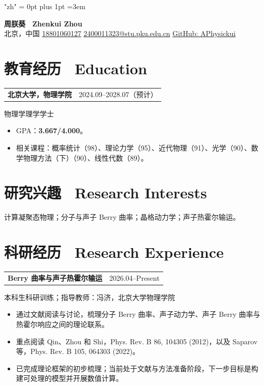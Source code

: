 \documentclass[10pt,a4paper]{article}
\makeatletter
\newcommand{\cventry}[2]{%
  \begin{tabularx}{\textwidth}{@{}Xr@{}}
    \textbf{#1} & #2
  \end{tabularx}
}
\makeatother
\begin{document}
\fontsize{9.5}{12}\selectfont
\XeTeXlinebreaklocale "zh"
\XeTeXlinebreakskip = 0pt plus 1pt
\emergencystretch=3em
\sloppy

\begin{center}
  {\LARGE\bfseries 周朕葵 \textbar\ Zhenkui Zhou}\\[4pt]
  北京，中国
  \enspace\textbar\enspace
  \href{tel:+8618801060127}{18801060127}
  \enspace\textbar\enspace
  \href{mailto:2400011323@stu.pku.edu.cn}{2400011323@stu.pku.edu.cn}
  \enspace\textbar\enspace
  \href{https://github.com/APhysickui}{GitHub: APhysickui}
\end{center}

\section*{教育经历 \textbar\ Education}

\cventry{北京大学，物理学院}{2024.09--2028.07（预计）}
物理学理学学士
\begin{itemize}
  \item GPA：\textbf{3.667/4.000}。
  \item 相关课程：概率统计（98）、理论力学（95）、近代物理（91）、光学（90）、数学物理方法（下）（90）、线性代数（89）。
\end{itemize}

\section*{研究兴趣 \textbar\ Research Interests}
计算凝聚态物理；分子与声子 Berry 曲率；晶格动力学；声子热霍尔输运。

\section*{科研经历 \textbar\ Research Experience}

\cventry{Berry 曲率与声子热霍尔输运}{2026.04--Present}
本科生科研训练；指导教师：冯济，北京大学物理学院
\begin{itemize}
  \item 通过文献阅读与讨论，梳理分子 Berry 曲率、声子动力学、声子 Berry 曲率与热霍尔响应之间的理论联系。
  \item 重点阅读 Qin、Zhou 和 Shi，Phys. Rev. B 86, 104305 (2012)，以及 Saparov 等，Phys. Rev. B 105, 064303 (2022)。
  \item 已完成理论框架的初步梳理；当前处于文献与方法准备阶段，下一步目标是构建可处理的模型并开展数值计算。
\end{itemize}
\end{document}
